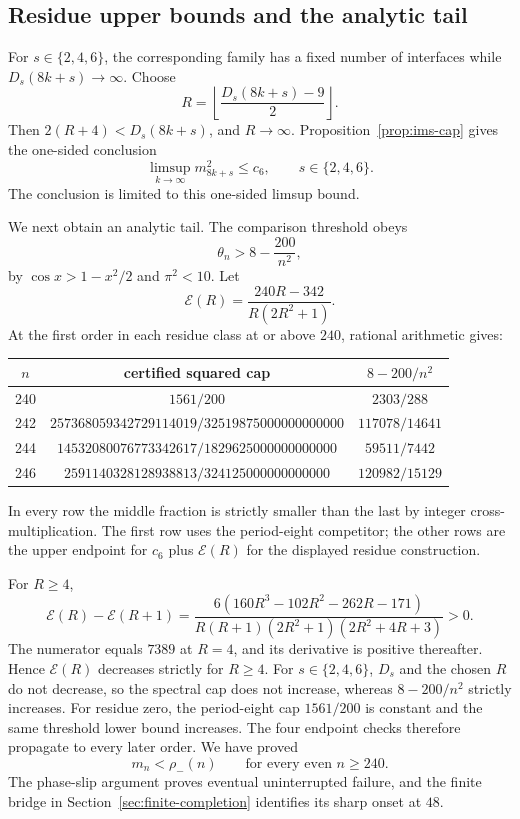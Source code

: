 \subsection{Residue upper bounds and the analytic tail}
\label{subsec:residue-upper-bounds}

For \(s\in\{2,4,6\}\), the corresponding family has a fixed number of
interfaces while \(D_s(8k+s)\to\infty\).  Choose
\[
R=\left\lfloor\frac{D_s(8k+s)-9}{2}\right\rfloor.
\]
Then \(2(R+4)<D_s(8k+s)\), and \(R\to\infty\).
Proposition~\ref{prop:ims-cap} gives the one-sided conclusion
\begin{equation}\label{eq:residue-limsup}
\limsup_{k\to\infty}m_{8k+s}^2\leq c_6,
\qquad s\in\{2,4,6\}.
\end{equation}
The conclusion is limited to this one-sided limsup bound.

We next obtain an analytic tail. The comparison threshold obeys
\[
\theta_n>8-\frac{200}{n^2},
\]
by \(\cos x>1-x^2/2\) and \(\pi^2<10\).  Let
\[
\mathcal E(R)=\frac{240R-342}{R(2R^2+1)}.
\]
At the first order in each residue class at or above \(240\), rational
arithmetic gives:
\begin{center}
\begin{tabular}{c@{\quad}c@{\quad}c}
\toprule
\(n\)&certified squared cap&\(8-200/n^2\)\\
\midrule
240&\(1561/200\)&\(2303/288\)\\
242&\(257368059342729114019/32519875000000000000\)&\(117078/14641\)\\
244&\(14532080076773342617/1829625000000000000\)&\(59511/7442\)\\
246&\(2591140328128938813/324125000000000000\)&\(120982/15129\)\\
\bottomrule
\end{tabular}
\end{center}
In every row the middle fraction is strictly smaller than the last by
integer cross-multiplication.  The first row uses the period-eight
competitor; the other rows are the upper endpoint for \(c_6\) plus
\(\mathcal E(R)\) for the displayed residue construction.

For \(R\geq4\),
\[
\mathcal E(R)-\mathcal E(R+1)
=\frac{6(160R^3-102R^2-262R-171)}
{R(R+1)(2R^2+1)(2R^2+4R+3)}>0.
\]
The numerator equals \(7389\) at \(R=4\), and its derivative is positive
thereafter. Hence \(\mathcal E(R)\) decreases strictly for \(R\geq4\).
For \(s\in\{2,4,6\}\), \(D_s\) and the chosen \(R\) do not decrease, so the
spectral cap does not increase, whereas \(8-200/n^2\) strictly increases.
For residue zero, the period-eight cap \(1561/200\) is constant and the same
threshold lower bound increases.  The four endpoint checks therefore
propagate to every later order.  We have proved
\[
m_n<\rho_-(n)\qquad
\text{for every even }n\geq240.
\]
The phase-slip argument proves eventual uninterrupted failure, and the
finite bridge in Section~\ref{sec:finite-completion} identifies its sharp
onset at \(48\).

